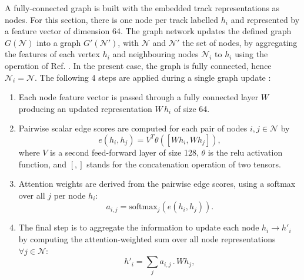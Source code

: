 A fully-connected graph is built with the embedded track representations as nodes. For this section, there is one node per track labelled $h_i$ and represented by a feature vector of dimension 64. The graph network updates the defined graph $G(\mathcal{N})$ into a graph $G'(\mathcal{N}')$, with $\mathcal{N}$ and $\mathcal{N}'$ the set of nodes, by aggregating the features of each vertex $h_i$ and neighbouring nodes $\mathcal{N}_i$ to $h_i$ using the operation of Ref. \cite{brody2022how}. In the present case, the graph is fully connected, hence $\mathcal{N}_i = \mathcal{N}$. The following 4 steps are applied during a single graph update \cite{ATL-PHYS-PUB-2022-027}:
\begin{enumerate}
  \item Each node feature vector is passed through a fully connected layer $W$ producing an updated representation $W\,h_i$ of size 64.
  \item Pairwise scalar edge scores are computed for each pair of nodes $i, j \in \mathcal{N}$ by 
  \begin{equation}
    e\left(h_i, h_j\right) = V^T \theta\left([Wh_i, Wh_j]\right),
  \end{equation}
  where $V$ is a second feed-forward layer of size 128, $\theta$ is the \gls{relu} activation function, and $[,]$ stands for the concatenation operation of two tensors. 
  \item Attention weights are derived from the pairwise edge scores, using a softmax over all $j$ per node $h_i$:
  \begin{equation}
    a_{i,j} = \textrm{softmax}_j\left(e(h_i, h_j)\right).
  \end{equation}
  \item The final step is to aggregate the information to update each node $h_i \rightarrow h'_i$ by computing the attention-weighted sum over all node representations $\forall j \in \mathcal{N}$: 
  \begin{equation}
    h'_i = \sum_{j} a_{i,j} \,.\, W h_j,
  \end{equation} 
\end{enumerate}

